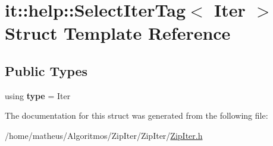 \hypertarget{structit_1_1help_1_1SelectIterTag_3_01Iter_01_4}{}\section{it\+:\+:help\+:\+:Select\+Iter\+Tag$<$ Iter $>$ Struct Template Reference}
\label{structit_1_1help_1_1SelectIterTag_3_01Iter_01_4}
\subsection*{Public Types}
\begin{DoxyCompactItemize}
\item 
using {\bfseries type} = Iter\hypertarget{structit_1_1help_1_1SelectIterTag_3_01Iter_01_4_a7357cce64ed4c2e4a225b4dce5a5341d}{}\label{structit_1_1help_1_1SelectIterTag_3_01Iter_01_4_a7357cce64ed4c2e4a225b4dce5a5341d}

\end{DoxyCompactItemize}


The documentation for this struct was generated from the following file\+:\begin{DoxyCompactItemize}
\item 
/home/matheus/\+Algoritmos/\+Zip\+Iter/\+Zip\+Iter/\hyperlink{ZipIter_8h}{Zip\+Iter.\+h}\end{DoxyCompactItemize}
